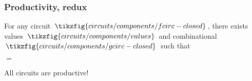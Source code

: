 \begin{frame}
    \frametitle{Productivity, redux}

    \begin{theorem}
        For any circuit $\,\tikzfig{circuits/components/fcirc-closed}\,$, there exists values $\,\tikzfig{circuits/components/values}\,$ and combinational $\,\tikzfig{circuits/components/gcirc-closed}\,$ such that 

        \pause

        \begin{center}
            \quad$=$\quad
        \end{center}
    \end{theorem}

    \pause
    \alert{All} circuits are productive!

\end{frame}